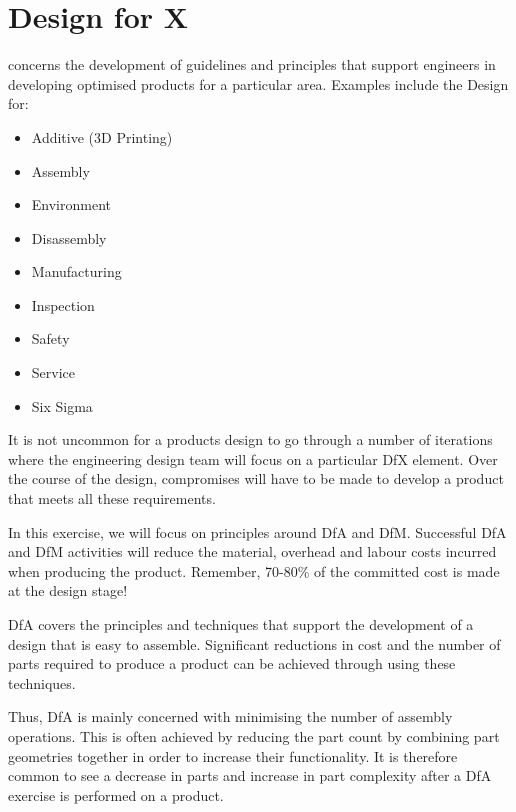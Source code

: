\section{Design for X}

 concerns the development of guidelines and principles that support engineers in developing optimised products for a particular area. Examples include the Design for:

\begin{multicols}{2}
    \begin{itemize}
        \item Additive (3D Printing)
        \item Assembly
        \item Environment
        \item Disassembly
        \item Manufacturing
        \item Inspection
        \item Safety
        \item Service
        \item Six Sigma
    \end{itemize}
\end{multicols}


It is not uncommon for a products design to go through a number of iterations where the engineering design team will focus on a particular \ac{DfX} element.
Over the course of the design, compromises will have to be made to develop a product that meets all these requirements.

In this exercise, we will focus on principles around \acf{DfA} and \acf{DfM}.
Successful \ac{DfA} and \ac{DfM} activities will reduce the material, overhead and labour costs incurred when producing the product.
Remember, 70-80\% of the committed cost is made at the design stage!\cite{ullman2002}\cite{corbett1986}\cite{mileham1993}

\acf{DfA} covers the principles and techniques that support the development of a design that is easy to assemble. Significant reductions in cost and the number of parts required to produce a product can be achieved through using these techniques.

Thus, \ac{DfA} is mainly concerned with minimising the number of assembly operations.
This is often achieved by reducing the part count by combining part geometries together in order to increase their functionality.
It is therefore common to see a decrease in parts and increase in part complexity after a \ac{DfA}  exercise is performed on a product. 

